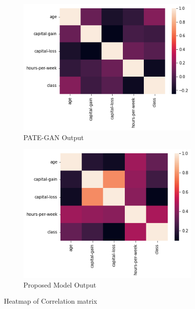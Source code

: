 \documentclass{article}
\begin{document}
\begin{figure}
     \bigskip
     \begin{subfigure}[b]{0.48\textwidth}
        \centering
        \includegraphics[width=\textwidth]{images/census_heatmap_pategan.png}
        \caption{PATE-GAN Output}
        \label{fig:corrmatrix_pategan}
    \end{subfigure}
    \hfill
     \begin{subfigure}[b]{0.48\textwidth}
         \centering
         \includegraphics[width=\textwidth]{images/census_heatmap_teacher.png}
         \caption{Proposed Model Output}
         \label{fig:corrmatrix_teacher}
     \end{subfigure}
        \caption{Heatmap of Correlation matrix}
        \label{fig:heatmap}
\end{figure}
\end{document}
